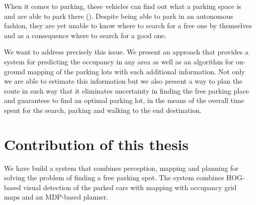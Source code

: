     When it comes to parking, these vehicles can find out what a parking space is and are able to park there (\cite{auto_cars_burgard,auto_parking09,auto_park2_11}). Despite being able to park in an autonomous fashion, they are yet unable to know where to search for a free one by themselves and as a consequence where to search for a good one.

    We want to address precisely this issue. We present an approach that provides a system for predicting the occupancy in any area as well as an algorithm for on-ground mapping of the parking lots with such additional information. Not only we are able to estimate this information but we also present a way to plan the route in such way that it eliminates uncertainty in finding the free parking place and guarantees to find an optimal parking lot, in the means of the overall time spent for the search, parking and walking to the end destination.

    \section{Contribution of this thesis} %
    \label{sec:contribution_of_this_thesis}
        We have build a system that combines perception, mapping and planning for solving the problem of finding a free parking spot. The system combines HOG-based visual detection of the parked cars with mapping with occupancy grid maps and an MDP-based planner.
